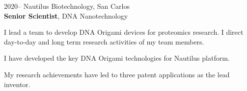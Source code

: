 \documentclass[12pt,letterpaper]{report}
\newcommand{\listitemspace}{0.25em}
\renewenvironment{itemize}
{\begin{list}{}{\setlength{\leftmargin}{0em}
                \setlength{\parskip}{0em}
                \setlength{\itemsep}{\listitemspace}
                \setlength{\parsep}{\listitemspace}}}
{\end{list}}
\begin{document}
    \begin{tablist}

        \item[2020--]   \tab{}Nautilus Biotechnology, San Carlos \\
                             \textbf{Senior Scientist}, DNA Nanotechnology\\
                             \begin{itemize}
                                \item \textbullet \hspace{0.2cm} I lead a team to develop DNA Origami devices for proteomics research. I direct day-to-day and long term research activities of my team members.
                                \item \textbullet \hspace{0.2cm} I have developed the key DNA Origami technologies for Nautilus platform.
                                \item \textbullet \hspace{0.2cm} My research achievements have led to three patent applications as the lead inventor. 
                             \end{itemize}


\end{tablist}
\end{document}
